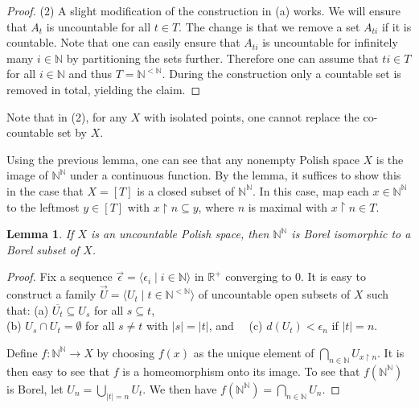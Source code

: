 \documentclass[10pt]{amsart}
\newcommand{\RR}{\mathbb{R}}
\newcommand{\NN}{\mathbb{N}}
\newtheorem{lemma}[theorem]{Lemma}
\theoremstyle{definition}
\theoremstyle{remark}
\begin{document}
\begin{proof}
\bigskip 

(2) 
A slight modification of the construction in (a) works. 
We will ensure that $A_t$ is uncountable for all $t\in T$. 
The change is that we remove a set $A_{ti}$ if it is countable. Note that one can easily ensure that $A_{ti}$ is uncountable for infinitely many $i\in\NN$ by partitioning the sets further. Therefore one can assume that $ti\in T$ for all $i\in\NN$ and thus $T=\NN^{{<}\NN}$. 
During the construction only a countable set is removed in total, yielding the claim. 
\end{proof} 

Note that in (2), for any $X$ with isolated points, one cannot replace the co-countable set by $X$. 


\iffalse 
Using the previous lemma, one can see that any nonempty Polish space $X$ is the image of $\NN^\NN$ under a continuous function. 
By the lemma, it suffices to show this in the case that $X=[T]$ is a closed subset of $\NN^\NN$. In this case, map each $x\in \NN^\NN$ to the leftmost $y\in [T]$ with $x{\upharpoonright}n \subseteq y$, where $n$ is maximal with $x{\upharpoonright}n\in T$. 

\begin{lemma}  
If $X$ is an uncountable Polish space, then $\NN^\NN$ is Borel isomorphic to a Borel subset of $X$. 
\end{lemma} 
\begin{proof} 
Fix a sequence $\vec{\epsilon}=\langle \epsilon_i \mid i\in\NN\rangle$ in $\RR^+$ converging to $0$. 
It is easy to construct a family $\vec{U}=\langle U_t\mid t\in \NN^{<\NN}\rangle$ of uncountable open subsets of $X$ such that: 
(a) $\overline{U_t}\subseteq U_s$ for all $s\subseteq t$, \\ 
(b) $U_s\cap U_t=\emptyset$ for all $s\neq t$ with $|s|=|t|$, and \ \  (c) $d(U_t)<\epsilon_n$ if $|t|=n$. 

Define $f\colon \NN^\NN\rightarrow X$ by choosing $f(x)$ as the unique element of $\bigcap_{n\in \NN} U_{x{\upharpoonright}n}$. 
It is then easy to see that $f$ is a homeomorphism onto its image. 
To see that $f(\NN^\NN)$ is Borel, let $U_n=\bigcup_{|t|=n} U_t$. We then have $f(\NN^\NN)=\bigcap_{n\in\NN} U_n$. 
\end{proof} 
\end{document}
